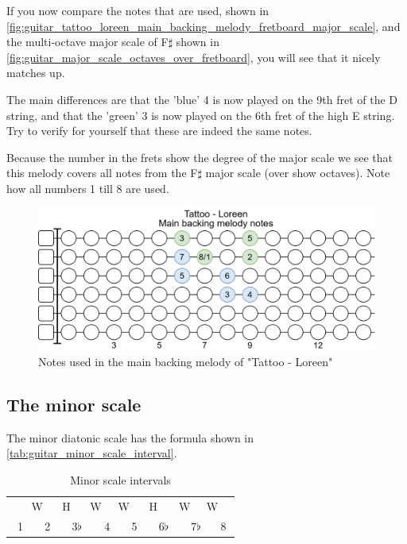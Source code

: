 If you now compare the notes that are used, shown in \autoref{fig:guitar_tattoo_loreen_main_backing_melody_fretboard_major_scale}, and the multi-octave major scale of F$\sharp$ shown in \autoref{fig:guitar_major_scale_octaves_over_fretboard}, you will see that it nicely matches up.

The main differences are that the 'blue' 4 is now played on the 9th fret of the D string, and that the 'green' 3 is now played on the 6th fret of the high E string. Try to verify for yourself that these are indeed the same notes.

Because the number in the frets show the degree of the major scale we see that this melody covers all notes from the F$\sharp$ major scale (over show octaves). Note how all numbers 1 till 8 are used.

\begin{figure}[h]
	\centering
	\includegraphics[height=0.2\textheight]{../../Images/NotesUsedInMainBackingMelodyTattooLoreen.png}
	\caption{Notes used in the main backing melody of "Tattoo - Loreen"}
	\label{fig:guitar_tattoo_loreen_main_backing_melody_fretboard_major_scale}
\end{figure}

\newpage

\subsection{The minor scale}

The minor diatonic scale has the formula shown in \autoref{tab:guitar_minor_scale_interval}.

\begin{table}[h]
	\centering
	\begin{tabular}{*{16}{c}}
		& \multicolumn{2}{P{4mm}}{\large{W}} & \multicolumn{2}{P{4mm}}{\large{H}} & \multicolumn{2}{P{4mm}}{\large{W}} & \multicolumn{2}{P{4mm}}{\large{W}} & \multicolumn{2}{P{4mm}}{\large{H}} & \multicolumn{2}{P{4mm}}{\large{W}} & \multicolumn{2}{P{4mm}}{\large{W}} & \\
		\multicolumn{2}{P{4mm}}{1} & \multicolumn{2}{P{4mm}}{2} & \multicolumn{2}{P{4mm}}{3$\flat$} & \multicolumn{2}{P{4mm}}{4} & \multicolumn{2}{P{4mm}}{5} & \multicolumn{2}{P{4mm}}{6$\flat$} & \multicolumn{2}{P{4mm}}{7$\flat$} & \multicolumn{2}{P{4mm}}{8}
	\end{tabular}
	\caption{Minor scale intervals}
	\label{tab:guitar_minor_scale_interval}
\end{table}

